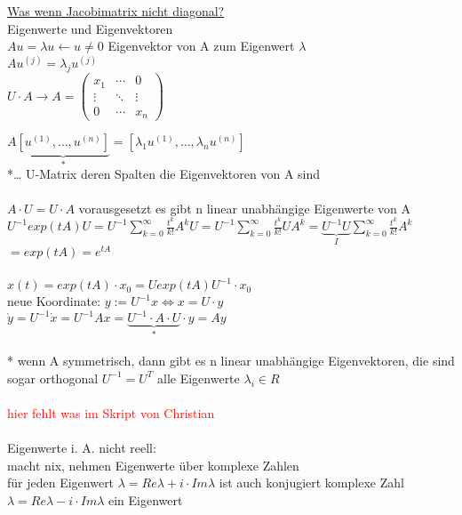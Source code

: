 \underline{Was wenn Jacobimatrix nicht diagonal?}\\
Eigenwerte und Eigenvektoren\\
$Au=\lambda u \leftarrow u\neq 0$ Eigenvektor von A zum Eigenwert $\lambda$\\
$Au^{(j)}=\lambda_j u^{(j)}$\\
$U \cdot A \rightarrow A=
\begin{pmatrix}
 x_1 & \cdots & 0 \\
 \vdots  & \ddots & \vdots  \\
 0 & \cdots & x_n
\end{pmatrix}
$

$A \underbrace{[u^{(1)}, … , u^{(n)}]}_{*} = [\lambda_1 u^{(1)}, … , \lambda_n u^{(n)}]$\\
*… U-Matrix deren Spalten die Eigenvektoren von A sind\\\\

$A \cdot U = U \cdot A$ vorausgesetzt es gibt n linear unabhängige Eigenwerte von A\\
$U^{-1} exp(tA) U = U^{-1} \sum_{k=0}^{\infty} \frac{t^k}{k!} A^k U = U^{-1} \sum_{k=0}^{\infty} \frac{t^k}{k!} U A^k = \underbrace{U^{-1} U}_{I} \sum_{k=0}^{\infty} \frac{t^k}{k!} A^k$\\
$= exp(tA)=e^{tA}$
\\\\

$x(t)=exp(tA) \cdot x_0 = U exp(tA) U^{-1} \cdot x_0$\\
neue Koordinate: $y:=U^{-1}x \Leftrightarrow x=U \cdot y$\\
$\dot{y}=U^{-1} \dot{x} = U^{-1} Ax = \underbrace{U^{-1} \cdot A \cdot U}_{*} \cdot y = Ay$\\\\
* wenn A symmetrisch, dann gibt es n linear unabhängige Eigenvektoren, die sind sogar orthogonal $U^{-1}=U^T$ alle Eigenwerte $\lambda_i \in R$\\\\

\textcolor{red}{hier fehlt was im Skript von Christian}\\\\

Eigenwerte i. A. nicht reell:\\
macht nix, nehmen Eigenwerte über komplexe Zahlen\\
für jeden Eigenwert $\lambda=Re \lambda + i \cdot Im \lambda$ ist auch konjugiert komplexe Zahl $\lambda=Re \lambda - i \cdot Im \lambda$ ein Eigenwert\\\\

